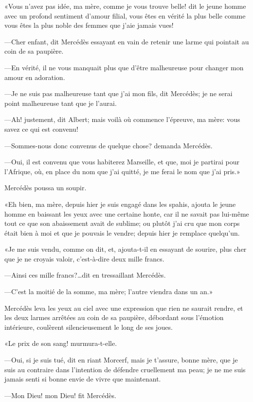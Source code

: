 «Vous n'avez pas idée, ma mère, comme je vous trouve belle! dit le jeune homme avec un profond sentiment d'amour filial, vous êtes en vérité la plus belle comme vous êtes la plus noble des femmes que j'aie jamais vues! 

—Cher enfant, dit Mercédès essayant en vain de retenir une larme qui pointait au coin de sa paupière. 

—En vérité, il ne vous manquait plus que d'être malheureuse pour changer mon amour en adoration. 

—Je ne suis pas malheureuse tant que j'ai mon fils, dit Mercédès; je ne serai point malheureuse tant que je l'aurai. 

—Ah! justement, dit Albert; mais voilà où commence l'épreuve, ma mère: vous savez ce qui est convenu! 

—Sommes-nous donc convenus de quelque chose? demanda Mercédès. 

—Oui, il est convenu que vous habiterez Marseille, et que, moi je partirai pour l'Afrique, où, en place du nom que j'ai quitté, je me ferai le nom que j'ai pris.» 

Mercédès poussa un soupir. 

«Eh bien, ma mère, depuis hier je suis engagé dans les spahis, ajouta le jeune homme en baissant les yeux avec une certaine honte, car il ne savait pas lui-même tout ce que son abaissement avait de sublime; ou plutôt j'ai cru que mon corps était bien à moi et que je pouvais le vendre; depuis hier je remplace quelqu'un. 

«Je me suis vendu, comme on dit, et, ajouta-t-il en essayant de sourire, plus cher que je ne croyais valoir, c'est-à-dire deux mille francs. 

—Ainsi ces mille francs?\dots dit en tressaillant Mercédès. 

—C'est la moitié de la somme, ma mère; l'autre viendra dans un an.» 

Mercédès leva les yeux au ciel avec une expression que rien ne saurait rendre, et les deux larmes arrêtées au coin de sa paupière, débordant sous l'émotion intérieure, coulèrent silencieusement le long de ses joues. 

«Le prix de son sang! murmura-t-elle. 

—Oui, si je suis tué, dit en riant Morcerf, mais je t'assure, bonne mère, que je suis au contraire dans l'intention de défendre cruellement ma peau; je ne me suis jamais senti si bonne envie de vivre que maintenant. 

—Mon Dieu! mon Dieu! fit Mercédès. 

